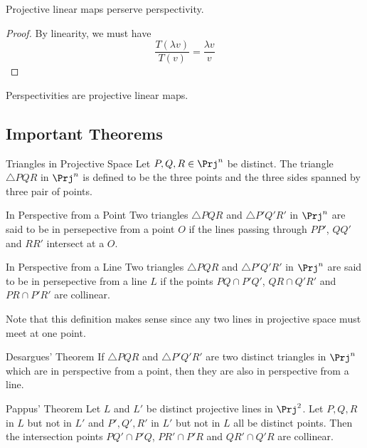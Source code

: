 \documentclass[a4paper]{article}
\begin{document}
\begin{prp}{}{} Projective linear maps perserve perspectivity. 
\begin{proof}
By linearity, we must have $$\frac{T(\lambda v)}{T(v)}=\frac{\lambda v}{v}$$
\end{proof}
\end{prp}

\begin{lmm}{}{} Perspectivities are projective linear maps. 
\end{lmm}

\subsection{Important Theorems}
\begin{defn}{Triangles in Projective Space}{} Let $P,Q,R\in\Prj^n$ be distinct. The triangle $\triangle PQR$ in $\Prj^n$ is defined to be the three points and the three sides spanned by three pair of points. 
\end{defn}

\begin{defn}{In Perspective from a Point}{} Two triangles $\triangle PQR$ and $\triangle P'Q'R'$ in $\Prj^n$ are said to be in persepective from a point $O$ if the lines passing through $PP'$, $QQ'$ and $RR'$ intersect at a $O$. 
\end{defn}

\begin{defn}{In Perspective from a Line}{} Two triangles $\triangle PQR$ and $\triangle P'Q'R'$ in $\Prj^n$ are said to be in persepective from a line $L$ if the points $PQ\cap P'Q'$, $QR\cap Q'R'$ and $PR\cap P'R'$ are collinear. 
\end{defn}

Note that this definition makes sense since any two lines in projective space must meet at one point. 

\begin{thm}{Desargues' Theorem}{} If $\triangle PQR$ and $\triangle P'Q'R'$ are two distinct triangles in $\Prj^n$ which are in perspective from a point, then they are also in perspective from a line. 
\end{thm}

\begin{thm}{Pappus' Theorem}{} Let $L$ and $L'$ be distinct projective lines in $\Prj^2$. Let $P,Q,R$ in $L$ but not in $L'$ and $P',Q',R'$ in $L'$ but not in $L$ all be distinct points. Then the intersection points $PQ'\cap P'Q$, $PR'\cap P'R$ and $QR'\cap Q'R$ are collinear. 
\end{thm}
\end{document}
